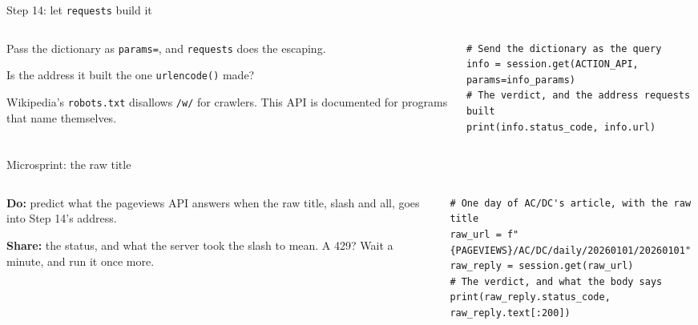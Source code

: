 \documentclass[9pt,aspectratio=169]{beamer}
\begin{document}
\begin{frame}[fragile]{Step 14: let \texttt{requests} build it}
    \begin{columns}[T]
        \begin{column}{0.37\textwidth}
            Pass the dictionary as \texttt{params=}, and \texttt{requests} does the escaping.

            \medskip
            Is the address it built the one \texttt{urlencode()} made?

            \medskip
            Wikipedia's \texttt{robots.txt} disallows \texttt{/w/} for crawlers. This API is documented for programs that name themselves.
        \end{column}
        \begin{column}{0.6\textwidth}
\begin{lstlisting}[style=lab]
# Send the dictionary as the query
info = session.get(ACTION_API, params=info_params)
# The verdict, and the address requests built
print(info.status_code, info.url)
\end{lstlisting}
        \end{column}
    \end{columns}
\end{frame}

\begin{frame}[fragile]{Microsprint: the raw title}
    \begin{columns}[T]
        \begin{column}{0.37\textwidth}
            \textbf{Do:} predict what the pageviews API answers when the raw title, slash and all, goes into Step 14's address.

            \medskip
            \textbf{Share:} the status, and what the server took the slash to mean. A 429? Wait a minute, and run it once more.
        \end{column}
        \begin{column}{0.6\textwidth}
\begin{lstlisting}[style=lab]
# One day of AC/DC's article, with the raw title
raw_url = f"{PAGEVIEWS}/AC/DC/daily/20260101/20260101"
raw_reply = session.get(raw_url)
# The verdict, and what the body says
print(raw_reply.status_code, raw_reply.text[:200])
\end{lstlisting}
        \end{column}
    \end{columns}
\end{frame}
\end{document}
